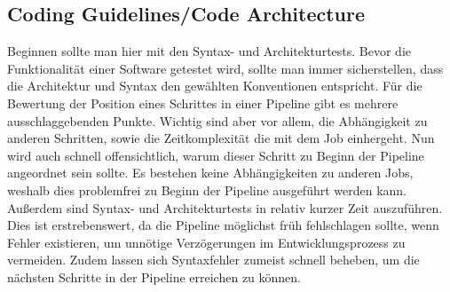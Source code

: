 \subsection{Coding Guidelines/Code Architecture}\label{subsec:codingGuidelines/codeArchitecture}

Beginnen sollte man hier mit den Syntax- und Architekturtests.
Bevor die Funktionalität einer Software getestet wird, sollte man immer sicherstellen, dass die Architektur und Syntax den gewählten Konventionen entspricht.
Für die Bewertung der Position eines Schrittes in einer Pipeline gibt es mehrere ausschlaggebenden Punkte.
Wichtig sind aber vor allem, die Abhängigkeit zu anderen Schritten, sowie die Zeitkomplexität die mit dem Job einhergeht.
Nun wird auch schnell offensichtlich, warum dieser Schritt zu Beginn der Pipeline angeordnet sein sollte.
Es bestehen keine Abhängigkeiten zu anderen Jobs, weshalb dies problemfrei zu Beginn der Pipeline ausgeführt werden kann.
Außerdem sind Syntax- und Architekturtests in relativ kurzer Zeit auszuführen.
Dies ist erstrebenswert, da die Pipeline möglichst früh fehlschlagen sollte, wenn Fehler existieren, um unnötige Verzögerungen im Entwicklungsprozess zu vermeiden.
Zudem lassen sich Syntaxfehler zumeist schnell beheben, um die nächsten Schritte in der Pipeline erreichen zu können.